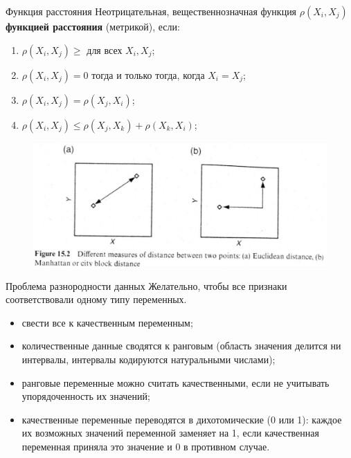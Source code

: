 \documentclass{beamer}
\begin{document}
\begin{frame}{Функция расстояния}
	Неотрицательная, вещественнозначная функция $\rho(X_i, X_j)$ \textbf{функцией расстояния} (метрикой), если:
	\begin{enumerate}
	    \item  $\rho(X_i ,X_j)\geq$ для всех  $X_i, X_j$;
	    \item  $\rho(X_i ,X_j)=0$ тогда и только тогда, когда $X_i=X_j$;
	    \item  $\rho(X_i ,X_j)=\rho(X_j ,X_i)$;	    	
	    \item  $\rho(X_i ,X_j)\leq\rho(X_j ,X_k)+\rho(X_k ,X_i)$;
	\end{enumerate}
	\begin{figure}[h]
		\centering
		\includegraphics[scale=0.3]{images/lec07-pic07.png}
	\end{figure}
\end{frame}

\begin{frame}{Проблема разнородности данных}
	Желательно, чтобы все признаки соответствовали одному типу переменных.
	\begin{itemize}
		\item свести все к качественным переменным;
		\item количественные данные сводятся к ранговым (область значения делится ни интервалы, интервалы кодируются натуральными числами);
		\item ранговые переменные можно считать качественными, если не учитывать упорядоченность их значений;
		\item качественные переменные переводятся в дихотомические (0 или 1): каждое их возможных значений переменной заменяет на 1, если качественная переменная приняла это значение и 0 в противном случае.	
	\end{itemize}
\end{frame}
\end{document}

